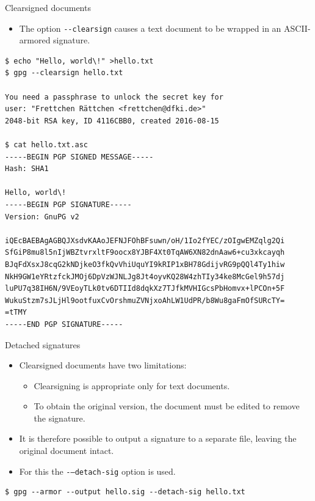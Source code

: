 \documentclass[%
mode=present,%
paper=smartboard,
size=20pt,
]{powerdot}
\newcommand\vsp{\vspace{-16mm}}
\newcommand{\clopt}[1]{\texttt{{-}#1}}
\begin{document}
\makeatletter\renewcommand{\verbatim@font}{\tiny\tt}\makeatother
\begin{slide}[method=direct]{Clearsigned documents}
  \begin{itemize}
  \item The option \clopt{-clearsign} causes a text document to be
    wrapped in an ASCII-armored signature.
  \end{itemize}
\vsp
\begin{verbatim}
$ echo "Hello, world\!" >hello.txt
$ gpg --clearsign hello.txt

You need a passphrase to unlock the secret key for
user: "Frettchen Rättchen <frettchen@dfki.de>"
2048-bit RSA key, ID 4116CBB0, created 2016-08-15

$ cat hello.txt.asc
-----BEGIN PGP SIGNED MESSAGE-----
Hash: SHA1

Hello, world\!
-----BEGIN PGP SIGNATURE-----
Version: GnuPG v2

iQEcBAEBAgAGBQJXsdvKAAoJEFNJFOhBFsuwn/oH/1Io2fYEC/zOIgwEMZqlg2Qi
SfGiP8mu8l5nIjWBZtvrxltF9oocx8YJBF4Xt0TqAW6XN82dnAaw6+cu3xkcayqh
BJqFdXsxJ8cqG2kNDjkeO3fkQvVhiUquYI9kRIP1xBH78GdijvRG9pQQl4Ty1hiw
NkH9GW1eYRtzfckJMOj6DpVzWJNLJg8Jt4oyvKQ28W4zhTIy34ke8McGel9h57dj
luPU7q38IH6N/9VEoyTLk0tv6DTIId8dqkXz7TJfkMVHIGcsPbHomvx+lPCOn+5F
WukuStzm7sJLjHl9ootfuxCvOrshmuZVNjxoAhLW1UdPR/b8Wu8gaFmOfSURcTY=
=tTMY
-----END PGP SIGNATURE-----
\end{verbatim}
\end{slide}

\makeatletter\renewcommand{\verbatim@font}{\footnotesize\tt}\makeatother
\begin{slide}[method=direct]{Detached signatures}
  \begin{itemize}
  \item Clearsigned documents have two limitations:
    \begin{itemize}
    \item Clearsigning is appropriate only for text documents.
    \item To obtain the original version, the document must be edited
      to remove the signature.
    \end{itemize}
  \item It is therefore possible to output a signature to a separate
    file, leaving the original document intact.
  \item For this the \clopt{--detach-sig} option is used.
  \end{itemize}
\begin{verbatim}
$ gpg --armor --output hello.sig --detach-sig hello.txt
\end{verbatim}
\end{slide}
\end{document}
